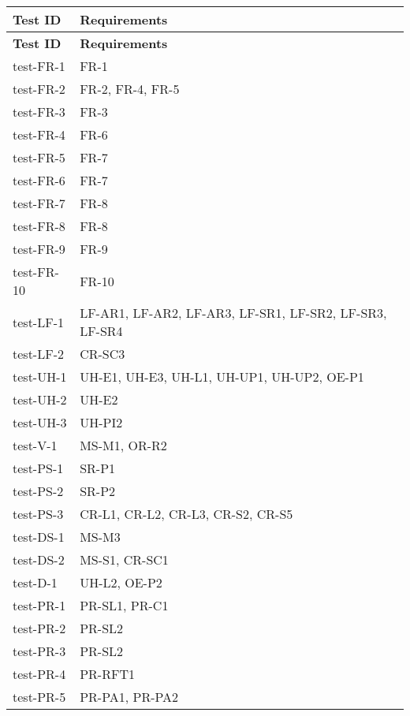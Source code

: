 \documentclass[12pt, titlepage]{article}
\begin{document}
\begin{center}
  \begin{longtable}{|>{\centering\arraybackslash}p{4cm}|>{\centering\arraybackslash}p{10cm}|}
  \hline
  \textbf{Test ID} & \textbf{Requirements} \\
  \hline
  \endfirsthead
  
  \hline
  \textbf{Test ID} & \textbf{Requirements} \\
  \hline
  \endhead
  
  test-FR-1 & FR-1 \\
  \hline
  test-FR-2 & FR-2, FR-4, FR-5 \\
  \hline
  test-FR-3 & FR-3 \\
  \hline
  test-FR-4 & FR-6 \\
  \hline
  test-FR-5 & FR-7 \\
  \hline
  test-FR-6 & FR-7 \\
  \hline
  test-FR-7 & FR-8 \\
  \hline
  test-FR-8 & FR-8 \\
  \hline
  test-FR-9 & FR-9 \\
  \hline
  test-FR-10 & FR-10 \\
  \hline
  test-LF-1 & LF-AR1, LF-AR2, LF-AR3, LF-SR1, LF-SR2, LF-SR3, LF-SR4 \\
  \hline
  test-LF-2 & CR-SC3 \\
  \hline
  test-UH-1 & UH-E1, UH-E3, UH-L1, UH-UP1, UH-UP2, OE-P1 \\
  \hline
  test-UH-2 & UH-E2 \\
  \hline
  test-UH-3 & UH-PI2 \\
  \hline
  test-V-1 & MS-M1, OR-R2 \\
  \hline
  test-PS-1 & SR-P1 \\
  \hline
  test-PS-2 & SR-P2 \\
  \hline
  test-PS-3 & CR-L1, CR-L2, CR-L3, CR-S2, CR-S5 \\
  \hline
  test-DS-1 & MS-M3 \\
  \hline
  test-DS-2 & MS-S1, CR-SC1 \\
  \hline
  test-D-1 & UH-L2, OE-P2 \\
  \hline
  test-PR-1 & PR-SL1, PR-C1 \\
  \hline
  test-PR-2 & PR-SL2 \\
  \hline
  test-PR-3 & PR-SL2 \\
  \hline
  test-PR-4 & PR-RFT1 \\
  \hline
  test-PR-5 & PR-PA1, PR-PA2 \\

\end{longtable}
\end{center}
\end{document}
